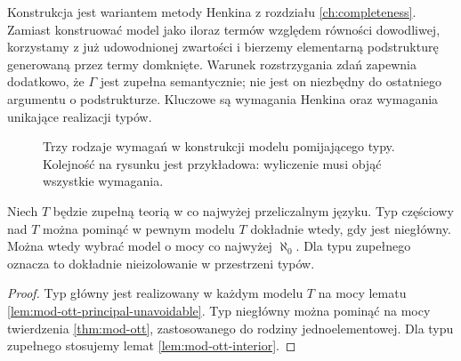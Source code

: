 Konstrukcja jest wariantem metody Henkina
z rozdziału \ref{ch:completeness}. Zamiast
konstruować model jako iloraz termów względem
równości dowodliwej, korzystamy z już udowodnionej
zwartości i bierzemy elementarną podstrukturę
generowaną przez termy domknięte. Warunek
rozstrzygania zdań zapewnia dodatkowo, że $\Gamma$
jest zupełna semantycznie; nie jest on niezbędny
do ostatniego argumentu o podstrukturze.
Kluczowe są wymagania Henkina oraz wymagania
unikające realizacji typów.

\begin{figure}[htbp]
\centering
{}
\caption{Trzy rodzaje wymagań w konstrukcji modelu
pomijającego typy. Kolejność na rysunku jest przykładowa:
wyliczenie musi objąć wszystkie wymagania.}
\label{fig:mod-ott-henkin}
\end{figure}

\begin{wniosek}
\label{cor:mod-ott-complete}
Niech $T$ będzie zupełną teorią w co najwyżej
przeliczalnym języku. Typ częściowy nad $T$
można pominąć w pewnym modelu $T$ dokładnie wtedy,
gdy jest niegłówny. Można wtedy wybrać model
o mocy co najwyżej $\aleph_0$.
Dla typu zupełnego oznacza to dokładnie
nieizolowanie w przestrzeni typów.
\end{wniosek}
\begin{proof}
Typ główny jest realizowany w każdym modelu $T$
na mocy lematu \ref{lem:mod-ott-principal-unavoidable}.
Typ niegłówny można pominąć na mocy twierdzenia
\ref{thm:mod-ott}, zastosowanego do rodziny
jednoelementowej. Dla typu zupełnego stosujemy
lemat \ref{lem:mod-ott-interior}.
\end{proof}

